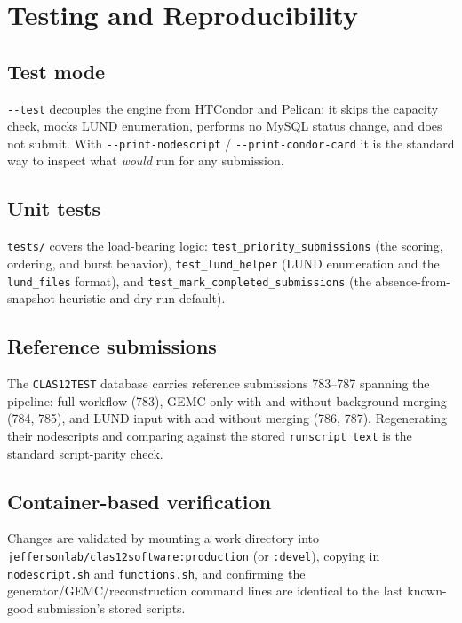 \section{Testing and Reproducibility}\label{ch:15}

\subsection{Test mode}

\texttt{-\allowbreak{}-\allowbreak{}test} decouples the engine from HTCondor and Pelican: it skips the capacity
check, mocks LUND enumeration, performs no MySQL status change, and does not submit. With
\texttt{-\allowbreak{}-\allowbreak{}print-\allowbreak{}nodescript} /
\texttt{-\allowbreak{}-\allowbreak{}print-\allowbreak{}condor-\allowbreak{}card} it is the standard way to
inspect what \textit{would} run for any submission.

\subsection{Unit tests}

\texttt{tests/\allowbreak{}} covers the load-bearing logic:
\texttt{test\_\allowbreak{}priority\_\allowbreak{}submissions} (the scoring, ordering, and burst behavior),
\texttt{test\_\allowbreak{}lund\_\allowbreak{}helper} (LUND enumeration and the
\texttt{lund\_\allowbreak{}files} format), and
\texttt{test\_\allowbreak{}mark\_\allowbreak{}completed\_\allowbreak{}submissions} (the absence-from-snapshot
heuristic and dry-run default).

\subsection{Reference submissions}

The \texttt{CLAS12TEST} database carries reference submissions 783--787 spanning the pipeline: full workflow
(783), GEMC-only with and without background merging (784, 785), and LUND input with and without merging (786,
787). Regenerating their nodescripts and comparing against the stored \texttt{runscript\_\allowbreak{}text} is
the standard script-parity check.

\subsection{Container-based verification}

Changes are validated by mounting a work directory into
\texttt{jeffersonlab/\allowbreak{}clas12software:\allowbreak{}production} (or \texttt{:\allowbreak{}devel}),
copying in \texttt{nodescript.\allowbreak{}sh} and \texttt{functions.\allowbreak{}sh}, and confirming the
generator/GEMC/reconstruction command lines are identical to the last known-good submission's stored scripts.

